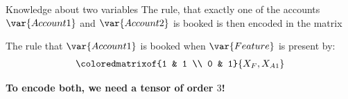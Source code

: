 \documentclass{beamer}
\begin{document}
    \begin{frame}{Knowledge about two variables}
        The rule, that exactly one of the accounts $\var{Account 1}$ and $\var{Account 2}$ is booked is then encoded in the matrix
        \begin{center}
        \end{center}

        The rule that $\var{Account 1}$ is booked when $\var{Feature}$ is present by:
        \begin{align*}
            \coloredmatrixof{1 & 1 \\ 0 & 1}{\catvariableof{F},\catvariableof{A1}}
        \end{align*}

        \begin{center}
            \bf To encode both, we need a tensor of order $3$!
        \end{center}
    \end{frame}
\end{document}
